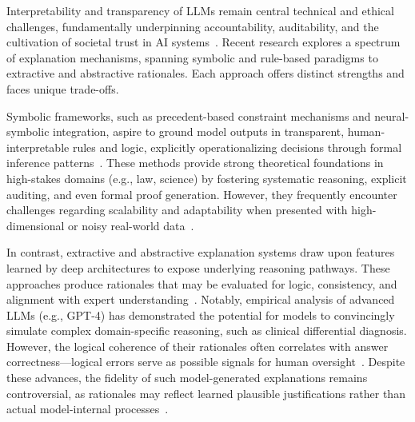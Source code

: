 Interpretability and transparency of LLMs remain central technical and ethical challenges, fundamentally underpinning accountability, auditability, and the cultivation of societal trust in AI systems~\cite{ref1, ref2, ref3, ref10, ref14, ref18, ref19, ref35, ref36, ref41, ref43, ref45, ref46, ref49, ref52, ref73, ref83, ref84, ref85}. Recent research explores a spectrum of explanation mechanisms, spanning symbolic and rule-based paradigms to extractive and abstractive rationales. Each approach offers distinct strengths and faces unique trade-offs.

Symbolic frameworks, such as precedent-based constraint mechanisms and neural-symbolic integration, aspire to ground model outputs in transparent, human-interpretable rules and logic, explicitly operationalizing decisions through formal inference patterns~\cite{ref14, ref18, ref19, ref45, ref73}. These methods provide strong theoretical foundations in high-stakes domains (e.g., law, science) by fostering systematic reasoning, explicit auditing, and even formal proof generation. However, they frequently encounter challenges regarding scalability and adaptability when presented with high-dimensional or noisy real-world data~\cite{ref14, ref18, ref41, ref46, ref83}.

In contrast, extractive and abstractive explanation systems draw upon features learned by deep architectures to expose underlying reasoning pathways. These approaches produce rationales that may be evaluated for logic, consistency, and alignment with expert understanding~\cite{ref1, ref3, ref10, ref35, ref41, ref45, ref49, ref85}. Notably, empirical analysis of advanced LLMs (e.g., GPT-4) has demonstrated the potential for models to convincingly simulate complex domain-specific reasoning, such as clinical differential diagnosis. However, the logical coherence of their rationales often correlates with answer correctness---logical errors serve as possible signals for human oversight~\cite{ref10, ref41}. Despite these advances, the fidelity of such model-generated explanations remains controversial, as rationales may reflect learned plausible justifications rather than actual model-internal processes~\cite{ref3, ref43, ref84}.


